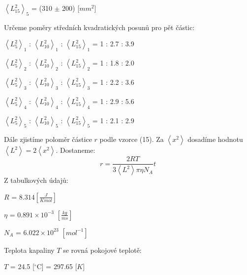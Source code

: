 \documentclass[a4paper,11pt]{article}
\begin{document}
\begin{minipage}{0.5\textwidth}
\begin{center}
            \vspace{5pt}
            \par $\left\langle L_{15}^2\right\rangle_5$ = (310 $\pm$ 200) [$mm^2$]
        \end{center}
        Určeme poměry středních kvadratických posunů pro pět částic: 
        \begin{center}
            $\left\langle L_{5}^2\right\rangle_1$ : $\left\langle L_{10}^2\right\rangle_1$ : $\left\langle L_{15}^2\right\rangle_1$ = 1 : 2.7 : 3.9
            \vspace{5pt}
            \par $\left\langle L_{5}^2\right\rangle_2$ : $\left\langle L_{10}^2\right\rangle_2$ : $\left\langle L_{15}^2\right\rangle_2$ = 1 : 1.8 : 2.0
            \vspace{5pt}
            \par $\left\langle L_{5}^2\right\rangle_3$ : $\left\langle L_{10}^2\right\rangle_3$ : $\left\langle L_{15}^2\right\rangle_3$ = 1 : 2.2 : 3.6
            \vspace{5pt}
            \par $\left\langle L_{5}^2\right\rangle_4$ : $\left\langle L_{10}^2\right\rangle_4$ : $\left\langle L_{15}^2\right\rangle_4$ = 1 : 2.9 : 5.6
            \vspace{5pt}
            \par $\left\langle L_{5}^2\right\rangle_5$ : $\left\langle L_{10}^2\right\rangle_5$ : $\left\langle L_{15}^2\right\rangle_5$ = 1 : 2.1 : 2.9
        \end{center}
        Dále zjistíme poloměr částice $r$ podle vzorce (15). Za $\left\langle x^2 \right\rangle$ dosadíme hodnotu $\left\langle L^2\right\rangle = 2\left\langle x^2 \right\rangle$. Dostaneme: 
        \begin{equation}
            r = \frac{2RT}{3 \left\langle L^2\right\rangle \pi \eta N_A} t
        \end{equation}
        Z tabulkových údajů: 
        \begin{center}
            $R$ = $8.314 \left[\frac{J}{K mol}\right]$
            \vspace{5pt}
            \par $\eta$ = $0.891 \times 10^{-3}$ $\left[\frac{kg}{m s}\right]$
            \vspace{5pt}
            \par $N_A$ = $6.022 \times 10^{23}$ $\left[mol^{-1}\right]$
        \end{center}
        Teplota kapaliny $T$ se rovná pokojové teplotě: 
        \begin{center}
            $T$ = 24.5 [$^\circ$C] = 297.65 [$K$]
        \end{center}
    \end{minipage}
\end{document}

